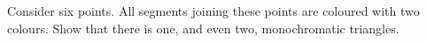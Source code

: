 Consider six points. All segments joining these points are coloured with two colours. Show that there is one, and even two, monochromatic triangles.
